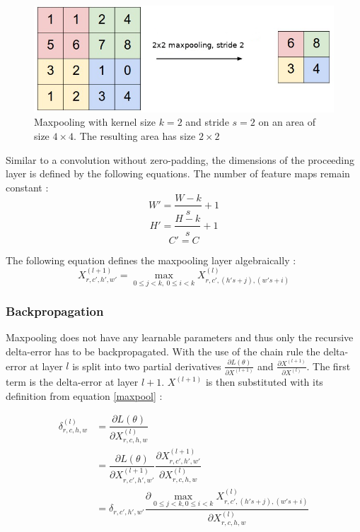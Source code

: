 \documentclass[a4paper, twoside]{article}
\newcommand*{\pd}[2]{\ensuremath{\dfrac{\partial #1}{\partial #2}}}
\newcommand*{\inpd}[2]{\ensuremath{\frac{\partial #1}{\partial #2}}}
\begin{document}
\begin{figure}[h]
	\centering
  		\includegraphics[scale=0.7]{maxpool.png}
  	\caption{Maxpooling with kernel size $k=2$ and stride $s=2$ on an area of size $4 \times 4$. The resulting area has size $2 \times 2$ \cite{figkonv}} \label{figmaxpool}
\end{figure}

Similar to a convolution without zero-padding, the dimensions of the proceeding layer is defined by the following equations. The number of feature maps remain constant \cite{cs231n} \cite{convmath} \cite{convarithmetic}: 
\begin{equation}
W' = \frac{W-k}{s}+1
\end{equation}
\begin{equation}
H' = \frac{H-k}{s}+1
\end{equation}
\begin{equation}
C' = C
\end{equation}

The following equation defines the maxpooling layer algebraically \cite{cs231n} \cite{convmath}:
\begin{equation}\label{maxpool}
X^{(l+1)}_{r,c',h',w'} = \underset{0 \leq j < k, \ 0 \leq i < k}{\max} X^{(l)}_{r,c',(h's+j),(w's+i)}
\end{equation}

\subsubsection{Backpropagation}
Maxpooling does not have any learnable parameters and thus only the recursive delta-error has to be backpropagated. With the use of the chain rule the delta-error at layer $l$ is split into two partial derivatives $\inpd{L(\theta)}{X^{(l+1)}}$ and $\inpd{X^{(l+1)}}{X^{(l)}}$. The first term is the delta-error at layer $l+1$. $X^{(l+1)}$ is then substituted with its definition from equation \eqref{maxpool} \cite{cs231n} \cite{convmath} \cite{webconv3}: 

\begin{equation}
\begin{split}
	\delta^{(l)}_{r,c,h,w}
		& = \pd{L(\theta)}{X^{(l)}_{r,c,h,w}} \\
		& = \pd{L(\theta)}{X^{(l+1)}_{r,c',h',w'}} \pd{X^{(l+1)}_{r,c',h',w'}}{X^{(l)}_{r,c,h,w}} \\
		& = \delta_{r,c',h',w'} \pd{\underset{0 \leq j < k,0 \leq i < k}{\max} X^{(l)}_{r,c',(h's+j),(w's+i)}}{X^{(l)}_{r,c,h,w}} \\
\end{split}
\end{equation}
\end{document}

